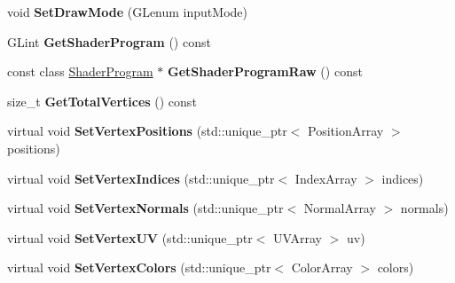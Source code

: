 \begin{DoxyCompactItemize}
\item 
\hypertarget{class_rendering_object_aa627eb310f11d0e04dbbb3665f58bb4e}{}void {\bfseries Set\+Draw\+Mode} (G\+Lenum input\+Mode)\label{class_rendering_object_aa627eb310f11d0e04dbbb3665f58bb4e}

\item 
\hypertarget{class_rendering_object_a80658debd2668b55a3c9fe86ec9f49fb}{}G\+Lint {\bfseries Get\+Shader\+Program} () const \label{class_rendering_object_a80658debd2668b55a3c9fe86ec9f49fb}

\item 
\hypertarget{class_rendering_object_ac9187166c98131aab185111e105528c2}{}const class \hyperlink{class_shader_program}{Shader\+Program} $\ast$ {\bfseries Get\+Shader\+Program\+Raw} () const \label{class_rendering_object_ac9187166c98131aab185111e105528c2}

\item 
\hypertarget{class_rendering_object_a3bb36683836c8c177984aa928cb1fb04}{}size\+\_\+t {\bfseries Get\+Total\+Vertices} () const \label{class_rendering_object_a3bb36683836c8c177984aa928cb1fb04}

\item 
\hypertarget{class_rendering_object_ada51886b7da1924a17d3a55e8fe90061}{}virtual void {\bfseries Set\+Vertex\+Positions} (std\+::unique\+\_\+ptr$<$ Position\+Array $>$ positions)\label{class_rendering_object_ada51886b7da1924a17d3a55e8fe90061}

\item 
\hypertarget{class_rendering_object_a61ea597df0c456834eac8eb4087fb573}{}virtual void {\bfseries Set\+Vertex\+Indices} (std\+::unique\+\_\+ptr$<$ Index\+Array $>$ indices)\label{class_rendering_object_a61ea597df0c456834eac8eb4087fb573}

\item 
\hypertarget{class_rendering_object_a4cd085aed01fbc5e4fae7076e00919d3}{}virtual void {\bfseries Set\+Vertex\+Normals} (std\+::unique\+\_\+ptr$<$ Normal\+Array $>$ normals)\label{class_rendering_object_a4cd085aed01fbc5e4fae7076e00919d3}

\item 
\hypertarget{class_rendering_object_a2a2b3c6ec2d13e8d3a4b6ac4c05ae11b}{}virtual void {\bfseries Set\+Vertex\+U\+V} (std\+::unique\+\_\+ptr$<$ U\+V\+Array $>$ uv)\label{class_rendering_object_a2a2b3c6ec2d13e8d3a4b6ac4c05ae11b}

\item 
\hypertarget{class_rendering_object_aa1170c47ff02b2305a54c8aab3460201}{}virtual void {\bfseries Set\+Vertex\+Colors} (std\+::unique\+\_\+ptr$<$ Color\+Array $>$ colors)\label{class_rendering_object_aa1170c47ff02b2305a54c8aab3460201}

\end{DoxyCompactItemize}
